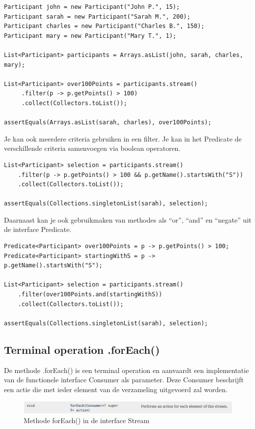 \begin{lstlisting}
Participant john = new Participant("John P.", 15);
Participant sarah = new Participant("Sarah M.", 200);
Participant charles = new Participant("Charles B.", 150);
Participant mary = new Participant("Mary T.", 1);

List<Participant> participants = Arrays.asList(john, sarah, charles, mary);

List<Participant> over100Points = participants.stream()
     .filter(p -> p.getPoints() > 100)
     .collect(Collectors.toList());

assertEquals(Arrays.asList(sarah, charles), over100Points);
\end{lstlisting}

Je kan ook meerdere criteria gebruiken in een filter. Je kan in het Predicate de verschillende criteria samenvoegen via boolean operatoren.

\begin{lstlisting}
List<Participant> selection = participants.stream()
    .filter(p -> p.getPoints() > 100 && p.getName().startsWith("S"))
    .collect(Collectors.toList());
    
assertEquals(Collections.singletonList(sarah), selection);
\end{lstlisting}

Daarnaast kan je ook gebruikmaken van methodes als ``or'',  ``and'' en ``negate'' uit de interface Predicate.
		
\begin{lstlisting}
Predicate<Participant> over100Points = p -> p.getPoints() > 100;
Predicate<Participant> startingWithS = p -> p.getName().startsWith("S");

List<Participant> selection = participants.stream()
    .filter(over100Points.and(startingWithS))
    .collect(Collectors.toList());

assertEquals(Collections.singletonList(sarah), selection);
\end{lstlisting}

\subsection{Terminal operation .forEach()}

De methode .forEach() is een terminal operation en aanvaardt een implementatie van de functionele interface Consumer als parameter. Deze Consumer beschrijft een actie die met ieder element van de verzameling uitgevoerd zal worden.

\begin{figure}[H]
  \includegraphics[width=\linewidth]{images/chapter_streams/stream_forEach.png}
  \caption{Methode forEach() in de interface Stream}
  \label{fig:stream_foreach}
\end{figure}


